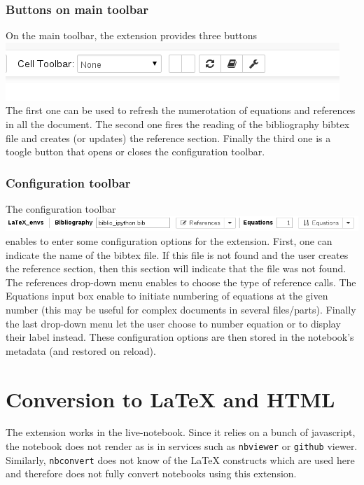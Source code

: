     \subsubsection{Buttons on main toolbar}\label{buttons-on-main-toolbar}

    On the main toolbar, the extension provides three buttons
\includegraphics{main_toolbar.png} The first one can be used to refresh
the numerotation of equations and references in all the document. The
second one fires the reading of the bibliography bibtex file and creates
(or updates) the reference section. Finally the third one is a toogle
button that opens or closes the configuration toolbar.

    \subsubsection{Configuration toolbar}\label{configuration-toolbar}

    The configuration toolbar \includegraphics{configuration_toolbar.png}
enables to enter some configuration options for the extension. First,
one can indicate the name of the bibtex file. If this file is not found
and the user creates the reference section, then this section will
indicate that the file was not found. The references drop-down menu
enables to choose the type of reference calls. The Equations input box
enable to initiate numbering of equations at the given number (this may
be useful for complex documents in several files/parts). Finally the
last drop-down menu let the user choose to number equation or to display
their label instead. These configuration options are then stored in the
notebook's metadata (and restored on reload).

    \section{Conversion to LaTeX and
HTML}\label{conversion-to-latex-and-html}

    The extension works in the live-notebook. Since it relies on a bunch of
javascript, the notebook does not render as is in services such as
\texttt{nbviewer} or \texttt{github} viewer. Similarly,
\texttt{nbconvert} does not know of the LaTeX constructs which are used
here and therefore does not fully convert notebooks using this
extension.

